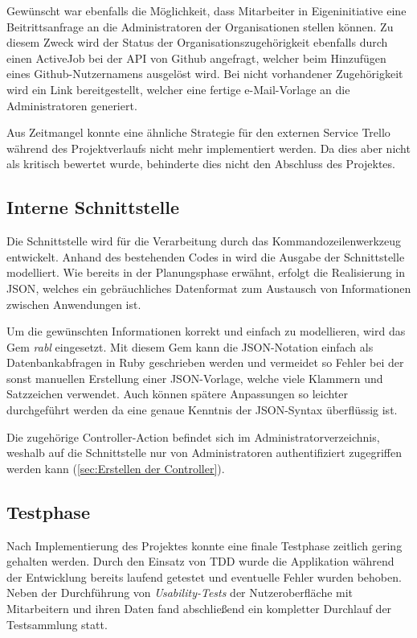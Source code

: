 
Gewünscht war ebenfalls die Möglichkeit, dass Mitarbeiter \ggfs in Eigeninitiative eine
Beitrittsanfrage an die Administratoren der Organisationen stellen können. Zu diesem Zweck wird der
Status der Organisationszugehörigkeit ebenfalls durch einen ActiveJob bei der API von Github
angefragt, welcher beim Hinzufügen eines Github-Nutzernamens ausgelöst wird.
Bei nicht vorhandener Zugehörigkeit wird ein Link bereitgestellt, welcher eine fertige e-Mail-Vorlage
an die Administratoren generiert.

Aus Zeitmangel konnte eine ähnliche Strategie für den externen Service Trello während des
Projektverlaufs nicht mehr implementiert werden. Da dies aber nicht als kritisch bewertet wurde,
behinderte dies nicht den Abschluss des Projektes.

\subsection{Interne Schnittstelle}
\label{sec:Interne Schnittstelle}
Die Schnittstelle wird für die Verarbeitung durch das Kommandozeilenwerkzeug  entwickelt.
Anhand des bestehenden Codes in  wird die Ausgabe der Schnittstelle modelliert.
Wie bereits in der Planungsphase erwähnt, erfolgt die Realisierung in \acs{JSON},
welches ein gebräuchliches Datenformat zum Austausch von Informationen zwischen Anwendungen ist.

Um die gewünschten Informationen korrekt und einfach zu modellieren, wird das Gem \textit{rabl}
eingesetzt. Mit diesem Gem kann die JSON-Notation einfach als Datenbankabfragen in Ruby
geschrieben werden und vermeidet so Fehler bei der sonst manuellen Erstellung einer JSON-Vorlage,
welche viele Klammern und Satzzeichen verwendet. Auch können spätere Anpassungen so leichter
durchgeführt werden da eine genaue Kenntnis der JSON-Syntax überflüssig ist.

Die zugehörige Controller-Action befindet sich im Administratorverzeichnis, weshalb auf die Schnittstelle
nur von Administratoren authentifiziert zugegriffen werden kann (\Vgl \ref{sec:Erstellen der Controller}).

\subsection{Testphase}
\label{sec:Testphase}
Nach Implementierung des Projektes konnte eine finale Testphase zeitlich gering gehalten werden.
Durch den Einsatz von \acs{TDD} wurde die Applikation während der Entwicklung bereits laufend
getestet und eventuelle Fehler wurden behoben. Neben der Durchführung von \textit{Usability-Tests}
der Nutzeroberfläche mit Mitarbeitern und ihren Daten fand abschließend ein kompletter
Durchlauf der Testsammlung statt.

